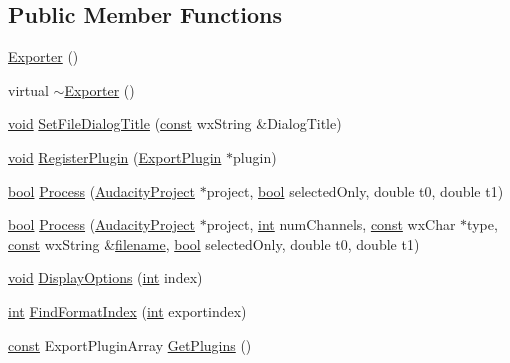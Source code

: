 \subsection*{Public Member Functions}
\begin{DoxyCompactItemize}
\item 
\hyperlink{class_exporter_a2a977cb5ac8f637fcb570e73f650eca0}{Exporter} ()
\item 
virtual \hyperlink{class_exporter_a44f24686958e01a543fd8b68b392658a}{$\sim$\+Exporter} ()
\item 
\hyperlink{sound_8c_ae35f5844602719cf66324f4de2a658b3}{void} \hyperlink{class_exporter_a14c2ea40a565ebce818a1f556f6d8375}{Set\+File\+Dialog\+Title} (\hyperlink{getopt1_8c_a2c212835823e3c54a8ab6d95c652660e}{const} wx\+String \&Dialog\+Title)
\item 
\hyperlink{sound_8c_ae35f5844602719cf66324f4de2a658b3}{void} \hyperlink{class_exporter_af88ea5abf11898d63eb985a268f3acf9}{Register\+Plugin} (\hyperlink{class_export_plugin}{Export\+Plugin} $\ast$plugin)
\item 
\hyperlink{mac_2config_2i386_2lib-src_2libsoxr_2soxr-config_8h_abb452686968e48b67397da5f97445f5b}{bool} \hyperlink{class_exporter_af3ab0fcc1790ee36eaf656049ed20c90}{Process} (\hyperlink{class_audacity_project}{Audacity\+Project} $\ast$project, \hyperlink{mac_2config_2i386_2lib-src_2libsoxr_2soxr-config_8h_abb452686968e48b67397da5f97445f5b}{bool} selected\+Only, double t0, double t1)
\item 
\hyperlink{mac_2config_2i386_2lib-src_2libsoxr_2soxr-config_8h_abb452686968e48b67397da5f97445f5b}{bool} \hyperlink{class_exporter_abd8a4fbd7cd83695bffba87248863f0f}{Process} (\hyperlink{class_audacity_project}{Audacity\+Project} $\ast$project, \hyperlink{xmltok_8h_a5a0d4a5641ce434f1d23533f2b2e6653}{int} num\+Channels, \hyperlink{getopt1_8c_a2c212835823e3c54a8ab6d95c652660e}{const} wx\+Char $\ast$type, \hyperlink{getopt1_8c_a2c212835823e3c54a8ab6d95c652660e}{const} wx\+String \&\hyperlink{test__portburn_8cpp_a7efa5e9c7494c7d4586359300221aa5d}{filename}, \hyperlink{mac_2config_2i386_2lib-src_2libsoxr_2soxr-config_8h_abb452686968e48b67397da5f97445f5b}{bool} selected\+Only, double t0, double t1)
\item 
\hyperlink{sound_8c_ae35f5844602719cf66324f4de2a658b3}{void} \hyperlink{class_exporter_aed1fcb841ba3f507c57867becd81704f}{Display\+Options} (\hyperlink{xmltok_8h_a5a0d4a5641ce434f1d23533f2b2e6653}{int} index)
\item 
\hyperlink{xmltok_8h_a5a0d4a5641ce434f1d23533f2b2e6653}{int} \hyperlink{class_exporter_a3e9150affe5c37edcc0cb9d6308834f5}{Find\+Format\+Index} (\hyperlink{xmltok_8h_a5a0d4a5641ce434f1d23533f2b2e6653}{int} exportindex)
\item 
\hyperlink{getopt1_8c_a2c212835823e3c54a8ab6d95c652660e}{const} Export\+Plugin\+Array \hyperlink{class_exporter_ab5874bec92ac5e0823b3f6763b03af04}{Get\+Plugins} ()
\end{DoxyCompactItemize}


